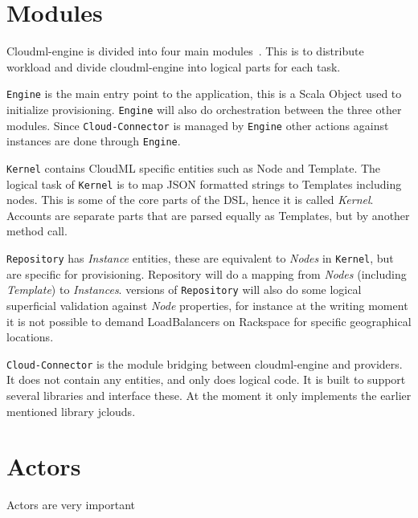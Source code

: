 \section{Modules}

Cloudml-engine is divided into four main modules~.
This is to distribute workload and divide cloudml-engine into logical parts for each task.

\texttt{Engine} is the main entry point to the application, this is a Scala Object used to initialize
provisioning.
\texttt{Engine} will also do orchestration between the three other modules.
Since \texttt{Cloud-Connector} is managed by \texttt{Engine} other actions against 
instances are done through \texttt{Engine}.

\texttt{Kernel} contains CloudML specific entities such as Node and Template.
The logical task of \texttt{Kernel} is to map JSON formatted strings to Templates including nodes.
This is some of the core parts of the DSL, hence it is called \emph{Kernel}.
Accounts are separate parts that are parsed equally as Templates, but by another method call.

\texttt{Repository} has \emph{Instance} entities, these are equivalent to \emph{Nodes} in \texttt{Kernel},
but are specific for provisioning. Repository will do a mapping from \emph{Nodes} (including \emph{Template})
to \emph{Instances}.  versions of \texttt{Repository} will also do some logical superficial validation
against \emph{Node} properties, for instance at the writing moment it is not possible to 
demand LoadBalancers on Rackspace for specific geographical locations.

\texttt{Cloud-Connector} is the module bridging between cloudml-engine and providers.
It does not contain any entities, and only does logical code. 
It is built to support several libraries and interface these. At the moment it only implements the earlier
mentioned library jclouds.

\section{Actors}

Actors are very important

